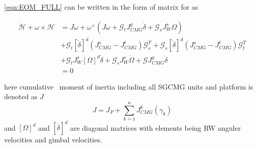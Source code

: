 \autoref{eqn:EOM_FULL} can be written in the form of matrix for as 
\begin{tcolorbox}
\begin{equation}
\begin{aligned}
\dot{\mathcal{H}} +\omega \times \mathcal{H} & =J\dot{\omega } +\omega ^{\times }\left( J\omega +\mathcal{G}_{t} J^{g}_{CMG}\dot{\delta } +\mathcal{G}_{s} J^{s}_{W} \Omega \right)\\
 & +\mathcal{G}_{t}[\dot{\delta }]^{d}\left( J^{s}_{CMG} -J^{t}_{CMG}\right)\mathcal{G}^{T}_{s} +\mathcal{G}_{s}[\dot{\delta }]^{d}\left( J^{s}_{CMG} -J^{t}_{CMG}\right)\mathcal{G}^{T}_{t}\\
 & +\mathcal{G}_{t} J^{s}_{W}[ \Omega ]^{d}\dot{\delta } +\mathcal{G}_{s} J^{s}_{W}\dot{\Omega } +\mathcal{G} J^{g}_{CMG}\ddot{\delta }\\
 & =0
\end{aligned}
\end{equation}

\end{tcolorbox}
here cumulative \ moment of inertia including all SGCMG units and platform is denoted as $\displaystyle J$ 
\begin{equation*}
J=J_{P} +\sum ^{n}_{k=1} J^{k}_{CMG}( \gamma _{k})
\end{equation*}
and $\displaystyle [ \Omega ]^{d}$ and $\displaystyle [\dot{\delta }]^{d}$ are diagonal matrices with elements being RW anguler velocities and gimbal velocities.